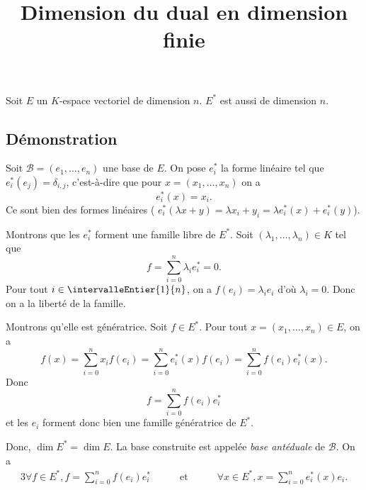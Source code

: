 \documentclass[fontsize=12pt,twoside=false,parskip=half, french]{scrartcl}
\title{Dimension du dual en dimension finie}
\date{}
\author{}
\begin{document}
\maketitle
   \begin{Theoreme}
      Soit $E$ un $K$-espace vectoriel de dimension $n$. $E^*$ est aussi de 
      dimension $n$.
   \end{Theoreme}
   \subsection{Démonstration}
      Soit $\mathcal{B} = (e_1, \ldots, e_n)$ une base de $E$. On pose $e_i^*$ la
      forme linéaire tel que $e_i^*(e_j) = \delta_{i, j}$, c'est-à-dire que pour
      $x = (x_1, \ldots, x_n)$ on a
      \[
        e_i^*(x) = x_i.
      \]
      Ce sont bien des formes linéaires (
      $e_i^*(\lambda x + y) = \lambda x_i + y_i = \lambda e_i^*(x) + e_i^*(y)$).
      
      Montrons que les $e_i^*$ forment une famille libre de $E^*$. Soit 
      $(\lambda_1, \ldots, \lambda_n) \in K$ tel que
      \[
        f = \sum_{i = 0}^n \lambda_i e_i^* = 0.
      \]
      Pour tout $i \in \intervalleEntier{1}{n}$, on a $f(e_i) = \lambda_i e_i$
      d'où $\lambda_i = 0$. Donc on a la liberté de la famille.
      
      Montrons qu'elle est génératrice. Soit $f \in E^*$.
      Pour tout $x = (x_1, \ldots, x_n) \in E$, on a 
      \[
        f(x) = \sum_{i = 0}^n x_i f(e_i) = \sum_{i = 0}^n e_i^*(x) f(e_i)
             = \sum_{i = 0}^n f(e_i) e_i^*(x).
      \]
      Donc
      \[
        f = \sum_{i = 0}^n f(e_i) e_i^*
      \]
      et les $e_i$ forment donc bien une famille génératrice de $E^*$.
      
      Donc, $\dim E^* = \dim E$. La base construite est appelée 
      \emph{base antéduale} de $\mathcal{B}$. On a
      \begin{alignat*}{3}
        \forall f \in E^*, f = \sum_{i = 0}^n f(e_i) e_i^* 
        & \quad & \text{ et } & \quad &
        \forall x \in E^*, x = \sum_{i = 0}^n e_i^*(x) e_i.
      \end{alignat*}
\end{document}
